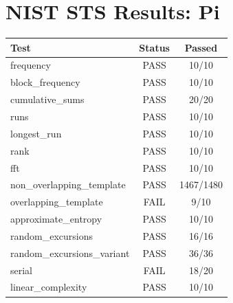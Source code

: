 \documentclass{article}
\begin{document}
\section*{NIST STS Results: Pi}
\begin{tabular}{lcc}
\toprule
Test & Status & Passed \\
\midrule
frequency & PASS & 10/10 \\
block_frequency & PASS & 10/10 \\
cumulative_sums & PASS & 20/20 \\
runs & PASS & 10/10 \\
longest_run & PASS & 10/10 \\
rank & PASS & 10/10 \\
fft & PASS & 10/10 \\
non_overlapping_template & PASS & 1467/1480 \\
overlapping_template & FAIL & 9/10 \\
approximate_entropy & PASS & 10/10 \\
random_excursions & PASS & 16/16 \\
random_excursions_variant & PASS & 36/36 \\
serial & FAIL & 18/20 \\
linear_complexity & PASS & 10/10 \\
\bottomrule
\end{tabular}
\end{document}
